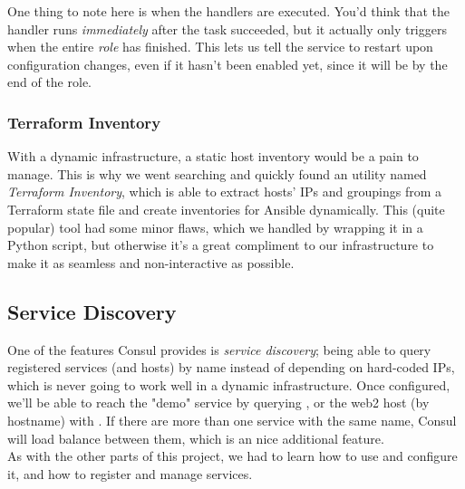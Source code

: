                 One thing to note here is when the handlers are executed. You'd think that the handler runs \textit{immediately} after the task succeeded, but it actually only triggers when the entire \textit{role} has finished. This lets us tell the service to restart upon configuration changes, even if it hasn't been enabled yet, since it will be by the end of the role.
            
            \subsubsection{Terraform Inventory}
                With a dynamic infrastructure, a static host inventory would be a pain to manage. This is why we went searching and quickly found an utility named \textit{Terraform Inventory}, which is able to extract hosts' IPs and groupings from a Terraform state file and create inventories for Ansible dynamically. This (quite popular) tool had some minor flaws, which we handled by wrapping it in a Python script, but otherwise it's a great compliment to our infrastructure to make it as seamless and non-interactive as possible.
            
        \subsection{Service Discovery} \label{consul}
            One of the features Consul provides is \textit{service discovery}; being able to query registered services (and hosts) by name instead of depending on hard-coded IPs, which is never going to work well in a dynamic infrastructure. Once configured, we'll be able to reach the "demo" service by querying , or the web2 host (by hostname) with . If there are more than one service with the same name, Consul will load balance between them, which is an nice additional feature.\\
            
            As with the other parts of this project, we had to learn how to use and configure it, and how to register and manage services.
            
